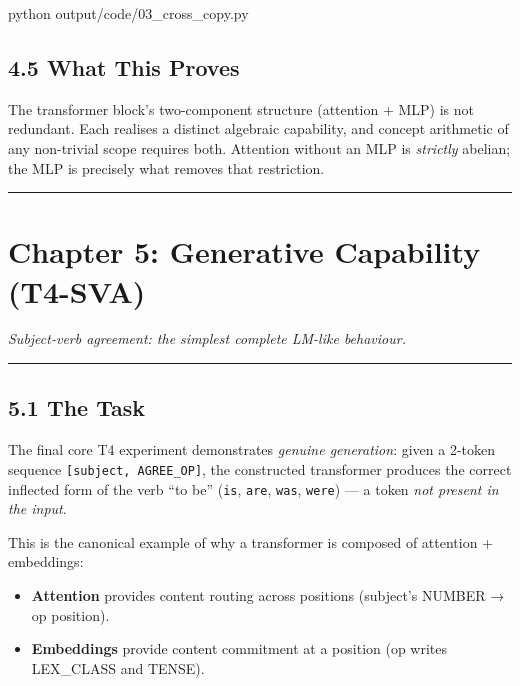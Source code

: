 \documentclass[
  twocolumn,
  10pt,
  a4paper]{article}
\newenvironment{Shaded}{}{}
\newcommand{\ExtensionTok}[1]{#1}
\newcommand{\NormalTok}[1]{#1}
\providecommand{\tightlist}{%
  \setlength{\itemsep}{0pt}\setlength{\parskip}{0pt}}
\begin{document}
\begin{Shaded}
\begin{Highlighting}[]
\ExtensionTok{python}\NormalTok{ output/code/03\_cross\_copy.py}
\end{Highlighting}
\end{Shaded}

\hypertarget{what-this-proves-2}{%
\subsection{4.5 What This Proves}\label{what-this-proves-2}}

The transformer block's two-component structure (attention + MLP) is not
redundant. Each realises a distinct algebraic capability, and concept
arithmetic of any non-trivial scope requires both. Attention without an
MLP is \emph{strictly} abelian; the MLP is precisely what removes that
restriction.

\begin{center}\rule{0.5\linewidth}{0.5pt}\end{center}

\hypertarget{chapter-5-generative-capability-t4-sva}{%
\FloatBarrier
\section{Chapter 5: Generative Capability
(T4-SVA)}\label{chapter-5-generative-capability-t4-sva}}

\emph{Subject-verb agreement: the simplest complete LM-like behaviour.}

\begin{center}\rule{0.5\linewidth}{0.5pt}\end{center}

\hypertarget{the-task}{%
\subsection{5.1 The Task}\label{the-task}}

The final core T4 experiment demonstrates \emph{genuine generation}:
given a 2-token sequence \texttt{{[}subject,\ AGREE\_OP{]}}, the
constructed transformer produces the correct inflected form of the verb
``to be'' (\texttt{is}, \texttt{are}, \texttt{was}, \texttt{were}) --- a
token \emph{not present in the input}.

This is the canonical example of why a transformer is composed of
attention + embeddings:

\begin{itemize}
\tightlist
\item
  \textbf{Attention} provides content routing across positions
  (subject's NUMBER → op position).
\item
  \textbf{Embeddings} provide content commitment at a position (op
  writes LEX\_CLASS and TENSE).
\end{itemize}
\end{document}
